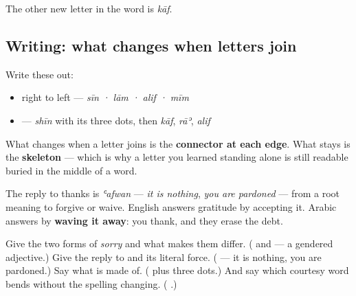 The other new letter in the word is \textbf{} \emph{kāf}.

\subsection*{Writing: what changes when letters join}
Write these out:

\begin{itemize}
\raggedright
  \item \textbf{} right to left — \emph{sīn · lām · alif · mīm}
  \item \textbf{} — \emph{shīn} with its three dots, then \emph{kāf}, \emph{rāʾ}, \emph{alif}
\end{itemize}

What changes when a letter joins is the \textbf{connector at each edge}. What stays is the \textbf{skeleton} — which is why a letter you learned standing alone is still readable buried in the middle of a word.

\begin{culture}
The reply to thanks is \textbf{} \emph{ʿafwan} — \emph{it is nothing}, \emph{you are pardoned} — from a root meaning to forgive or waive. English answers gratitude by accepting it. Arabic answers by \textbf{waving it away}: you thank, and they erase the debt.
\end{culture}

\begin{tcolorbox}[breakable,colback=teal!4,colframe=teal!35!black,title={Before you move on}]
Give the two forms of \emph{sorry} and what makes them differ. (\textbf{} and \textbf{} — a gendered adjective.) Give the reply to \textbf{} and its literal force. (\textbf{} — it is nothing, you are pardoned.) Say what \textbf{} is made of. (\textbf{} plus three dots.) And say which courtesy word bends without the spelling changing. (\textbf{ }.)
\end{tcolorbox}
